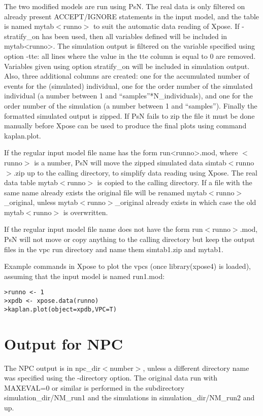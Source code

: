 The two modified models are run using PsN. The real data is only filtered on already present ACCEPT/IGNORE statements in the input model, and the table is named mytab$<$runno$>$ to suit the automatic data reading of Xpose. If -stratify\_on has been used, then all variables defined will be included in mytab<runno>. The simulation output is filtered on the variable specified using option -tte: all lines where the value in the tte column is equal to 0 are removed. Variables given using option stratify\_on will be included in simulation output. Also, three additional columns are created: one for the accumulated number of events for the (simulated) individual, one for the order number of the simulated individual (a number between 1 and “samples”*N\_individuals), and one for the order number of the simulation (a number between 1 and “samples”).  Finally the formatted simulated output is zipped. If PsN fails to zip the file it must be done manually before Xpose can be used to produce the final plots using command kaplan.plot.

If the regular input model file name has the form run<runno>.mod, where $<$runno$>$ is a number, PsN will move the zipped simulated data simtab$<$runno$>$.zip up to the calling directory, to simplify data reading using Xpose. The real data table mytab$<$runno$>$ is copied to the calling directory. If a file with the same name already exists the original file will be renamed mytab$<$runno$>$\_original, unless mytab$<$runno$>$\_original already exists in which case the old mytab$<$runno$>$ is overwritten. 

If the regular input model file name does not have the form run$<$runno$>$.mod, PsN will not move or copy anything to the calling directory but keep the output files in the vpc run directory and name them simtab1.zip and mytab1. 

Example commands in Xpose to plot the vpcs (once library(xpose4) is loaded), assuming that the input model is named run1.mod:
\begin{verbatim}
>runno <- 1
>xpdb <- xpose.data(runno)
>kaplan.plot(object=xpdb,VPC=T)
\end{verbatim}

\section{Output for NPC}
The NPC output is in npc\_dir$<$number$>$, unless a different directory name was specified using the -directory option. The original data run with MAXEVAL=0 or similar is performed in the subdirectory simulation\_dir/NM\_run1 and the simulations in simulation\_dir/NM\_run2 and up. 

